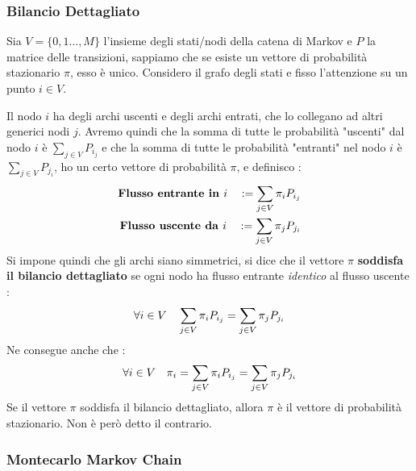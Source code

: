 \documentclass[12pt, letterpaper]{article}
\newcommand{\spaz}{{\text{\hphantom{aa}}}}
\begin{document}
\subsubsection{Bilancio Dettagliato}
Sia \(V=\{0,1\dots,M\}\) l'insieme degli stati/nodi della catena di Markov e \(P\) la matrice delle transizioni, 
sappiamo che se esiste un vettore di probabilità stazionario \(\pi\), esso è unico. Considero il grafo degli 
stati e fisso l'attenzione su un punto \(i\in V\).\begin{figure}[h]
\end{figure}
Il nodo \(i\) ha degli archi uscenti e degli archi entrati, che lo collegano ad altri generici nodi \(j\). Avremo quindi 
che la somma di tutte le probabilità "uscenti" dal nodo \(i\) è \(\displaystyle \sum_{j\in V}P_{i_j}\) e che 
la somma di tutte le probabilità "entranti" nel nodo \(i\) è \(\displaystyle \sum_{j\in V}P_{j_i}\),  ho un certo vettore 
di probabilità \(\pi\), e definisco  : \begin{eqnarray}
    \textbf{Flusso entrante in }i \spaz:=\sum_{j\in V}\pi_iP_{i_j}\\
    \textbf{Flusso uscente da }i \spaz:=\sum_{j\in V}\pi_jP_{j_i}
\end{eqnarray}
Si impone quindi che gli archi siano simmetrici, si dice che il vettore \(\pi\) \textbf{soddisfa il bilancio 
dettagliato} se ogni nodo ha flusso entrante \textit{identico} al flusso uscente :
$$\forall i\in V\spaz \sum_{j\in V}\pi_iP_{i_j}=\sum_{j\in V}\pi_jP_{j_i}$$
Ne consegue anche che : $$
\forall i\in V\spaz \pi_i=\sum_{j\in V}\pi_iP_{i_j}=\sum_{j\in V}\pi_jP_{j_i}
$$
Se il vettore \(\pi\) soddisfa il bilancio dettagliato, allora \(\pi\) è il vettore di probabilità stazionario. Non è però 
detto il contrario.
\subsubsection{Montecarlo Markov Chain}
\end{document}
